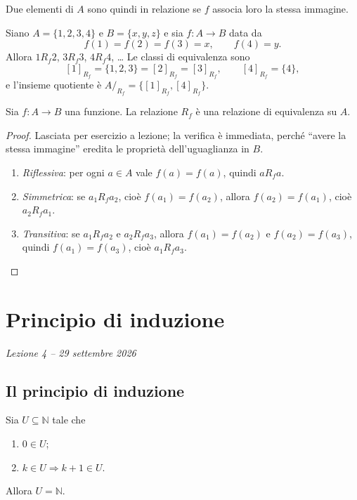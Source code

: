 \documentclass[11pt,a4paper]{article}
\begin{document}
Due elementi di $A$ sono quindi in relazione se $f$ associa loro la stessa
immagine.

\begin{esempio}
Siano $A = \{1, 2, 3, 4\}$ e $B = \{x, y, z\}$ e sia $f : A \to B$ data da
\[
f(1) = f(2) = f(3) = x, \qquad f(4) = y.
\]
Allora $1 \mathrel{R_f} 2$, $3 \mathrel{R_f} 3$, $4 \mathrel{R_f} 4$, \dots{}
Le classi di equivalenza sono
\[
[1]_{R_f} = \{1, 2, 3\} = [2]_{R_f} = [3]_{R_f}, \qquad
[4]_{R_f} = \{4\},
\]
e l'insieme quotiente è $A/_{R_f} = \{[1]_{R_f}, [4]_{R_f}\}$.
\end{esempio}

\begin{teorema}
Sia $f : A \to B$ una funzione. La relazione $R_f$ è una relazione di
equivalenza su $A$.
\end{teorema}

\begin{proof}
Lasciata per esercizio a lezione; la verifica è
immediata, perché ``avere la stessa immagine'' eredita le proprietà
dell'uguaglianza in $B$.
\begin{enumerate}
    \item \emph{Riflessiva}: per ogni $a \in A$ vale $f(a) = f(a)$, quindi
          $a \mathrel{R_f} a$.
    \item \emph{Simmetrica}: se $a_1 \mathrel{R_f} a_2$, cioè
          $f(a_1) = f(a_2)$, allora $f(a_2) = f(a_1)$, cioè
          $a_2 \mathrel{R_f} a_1$.
    \item \emph{Transitiva}: se $a_1 \mathrel{R_f} a_2$ e
          $a_2 \mathrel{R_f} a_3$, allora $f(a_1) = f(a_2)$ e
          $f(a_2) = f(a_3)$, quindi $f(a_1) = f(a_3)$, cioè
          $a_1 \mathrel{R_f} a_3$. \qedhere
\end{enumerate}
\end{proof}

\section[Principio di induzione (Lezione 4 -- 29 settembre 2026)]{Principio di induzione}
\noindent\emph{Lezione 4 -- 29 settembre 2026}
\subsection{Il principio di induzione}

\begin{osservazione}
Sia $U \subseteq \mathbb{N}$ tale che
\begin{enumerate}
    \item $0 \in U$;
    \item $k \in U \Rightarrow k + 1 \in U$.
\end{enumerate}
Allora $U = \mathbb{N}$.
\end{osservazione}
\end{document}
